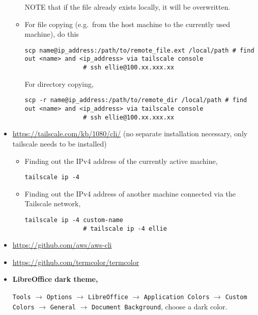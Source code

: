 \documentclass[12pt, a4paper]{scrbook}
\numberwithin{equation}{section}
\theoremstyle{definition}
\theoremstyle{definition}
\begin{document}
\begin{itemize}
\begin{itemize}
			NOTE that if the file already exists locally, it will be overwritten.
			
			\item For file copying (e.g.~from the host machine to the currently used machine), do this
			
			\begin{lstlisting}[style=mystylepython, label=alg:tailscale__scp_file, xleftmargin=\parindent]
				scp name@ip_address:/path/to/remote_file.ext /local/path # find out <name> and <ip_address> via tailscale console
				# ssh ellie@100.xx.xxx.xx
			\end{lstlisting}
			
			For directory copying, 
			
			\begin{lstlisting}[style=mystylepython, label=alg:tailscale__scp_dir, xleftmargin=\parindent]
				scp -r name@ip_address:/path/to/remote_dir /local/path # find out <name> and <ip_address> via tailscale console
				# ssh ellie@100.xx.xxx.xx
			\end{lstlisting}
			
		\end{itemize}
	
		\item \url{https://tailscale.com/kb/1080/cli/} (no separate installation necessary, only tailscale needs to be installed)
		
		\begin{itemize}
			\item Finding out the IPv4 address of the currently active machine,
			
			\begin{lstlisting}[style=mystylepython, label=alg:tailscale_ip, xleftmargin=\parindent]
				tailscale ip -4 
			\end{lstlisting}
			
			\item Finding out the IPv4 address of another machine connected via the Tailscale network,
			
			\begin{lstlisting}[style=mystylepython, label=alg:tailscale_ip, xleftmargin=\parindent]
				tailscale ip -4 custom-name
				# tailscale ip -4 ellie
			\end{lstlisting}
			
		\end{itemize}
		
		\item \url{https://github.com/aws/aws-cli}
		
		\item \url{https://github.com/termcolor/termcolor}
		
		\item \textbf{LibreOffice dark theme,}
		
		\texttt{Tools} $\rightarrow$ \texttt{Options} $\rightarrow$ \texttt{LibreOffice} $\rightarrow$ \texttt{Application Colors} $\rightarrow$ \texttt{Custom Colors} $\rightarrow$ \texttt{General} $\rightarrow$ \texttt{Document Background}, choose a dark color.
		
	\end{itemize}
\end{document}
